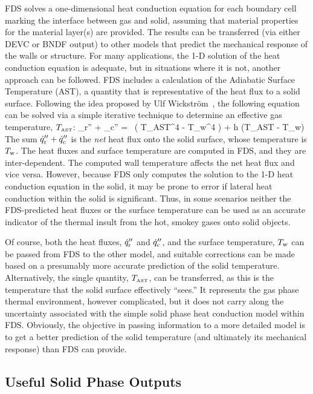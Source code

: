 \documentclass[11pt]{book}
\begin{document}
FDS solves a one-dimensional heat conduction equation for each boundary cell marking the interface between gas and solid, assuming that material properties for the material layer(s) are provided. The results can be transferred (via either {\ct DEVC} or {\ct BNDF} output) to other models that predict the mechanical response of the walls or structure. For many applications, the 1-D solution of the heat conduction equation is adequate, but in situations where it is not, another approach can be followed. FDS includes a calculation of the Adiabatic Surface Temperature (AST), a quantity that is representative of the heat flux to a solid surface. Following the idea proposed by Ulf Wickstr\"{o}m~\cite{Wickstrom:Interflam2007}, the following equation can be solved via a simple iterative technique to determine an effective gas temperature, $T_{\hbox{\tiny AST}}$: \be {}_{\rm r}'' + _{\rm c}'' = \epsilon \sigma \, \left( T_{\hbox{\tiny AST}}^4 - T_{\rm w}^4 \right) + h (T_{\hbox{\tiny AST}} - T_{\rm w})  \ee The sum $\dot{q}_{\rm r}'' + \dot{q}_{\rm c}''$ is the {\em net} heat flux onto the solid surface, whose temperature is $T_{\rm w}$. The heat fluxes and surface temperature are computed in FDS, and they are inter-dependent. The computed wall temperature affects the net heat flux and vice versa. However, because FDS only computes the solution to the 1-D heat conduction equation in the solid, it may be prone to error if lateral heat conduction within the solid is significant. Thus, in some scenarios neither the FDS-predicted heat fluxes or the surface temperature can be used as an accurate indicator of the thermal insult from the hot, smokey gases onto solid objects.

Of course, both the heat fluxes, $\dot{q}_{\rm r}''$ and $\dot{q}_{\rm c}''$, and the surface temperature, $T_{\rm w}$ can be passed from FDS to the other model, and suitable corrections can be made based on a presumably more accurate prediction of the solid temperature.  Alternatively, the single quantity, $T_{\hbox{\tiny AST}}$, can be transferred, as this is the temperature that the solid surface effectively ``sees.'' It represents the gas phase thermal environment, however complicated, but it does not carry along the uncertainty associated with the simple solid phase heat conduction model within FDS. Obviously, the objective in passing information to a more detailed model is to get a better prediction of the solid temperature (and ultimately its mechanical response) than FDS can provide.


\subsection{Useful Solid Phase Outputs}
\label{info:material_components}
\end{document}
